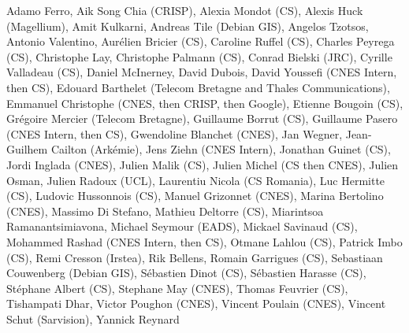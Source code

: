 Adamo Ferro,
Aik Song Chia (CRISP),
Alexia Mondot (CS),
Alexis Huck (Magellium),
Amit Kulkarni,
Andreas Tile (Debian GIS),
Angelos Tzotsos,
Antonio Valentino,
Aur\'elien Bricier (CS),
Caroline Ruffel (CS),
Charles Peyrega (CS),
Christophe Lay,
Christophe Palmann (CS),
Conrad Bielski (JRC),
Cyrille Valladeau (CS),
Daniel McInerney,
David Dubois,
David Youssefi  (CNES Intern, then CS),
Edouard Barthelet (Telecom Bretagne and Thales Communications),
Emmanuel Christophe (CNES, then CRISP, then Google),
Etienne Bougoin (CS),
Gr\'egoire Mercier (Telecom Bretagne),
Guillaume Borrut (CS),
Guillaume Pasero (CNES Intern, then CS),
Gwendoline Blanchet (CNES),
Jan Wegner,
Jean-Guilhem Cailton (Ark\'emie),
Jens Ziehn (CNES Intern),
Jonathan Guinet (CS),
Jordi Inglada (CNES),
Julien Malik (CS),
Julien Michel (CS then CNES),
Julien Osman,
Julien Radoux (UCL),
Laurentiu Nicola (CS Romania),
Luc Hermitte (CS),
Ludovic Hussonnois (CS),
Manuel Grizonnet (CNES),
Marina Bertolino (CNES),
Massimo Di Stefano,
Mathieu Deltorre (CS),
Miarintsoa Ramanantsimiavona,
Michael Seymour (EADS),
Mickael Savinaud (CS),
Mohammed Rashad (CNES Intern, then CS),
Otmane Lahlou (CS),
Patrick Imbo (CS),
Remi Cresson (Irstea),
Rik Bellens,
Romain Garrigues (CS),
Sebastiaan Couwenberg (Debian GIS),
S\'ebastien Dinot (CS),
S\'ebastien Harasse (CS),
St\'ephane Albert (CS),
Stephane May (CNES),
Thomas Feuvrier (CS),
Tishampati Dhar,
Victor Poughon (CNES),
Vincent Poulain (CNES),
Vincent Schut (Sarvision),
Yannick Reynard
